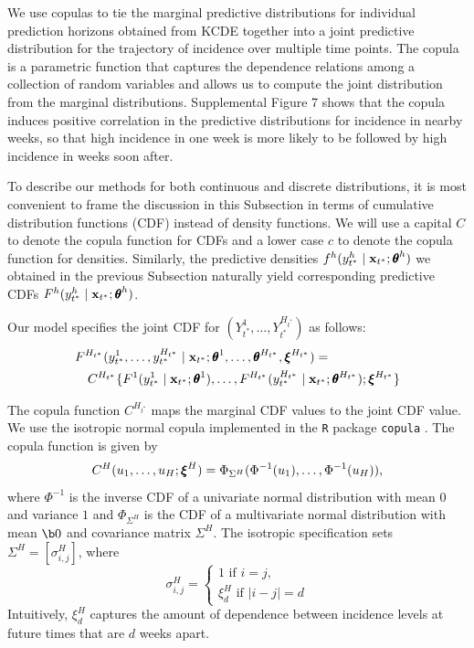 \documentclass[times, doublespace]{simauth}\usepackage[]{graphicx}\usepackage[]{color}
\begin{document}
We use copulas \cite{nelsen2007introductionCopulas} to tie the marginal
predictive distributions for individual prediction horizons obtained from KCDE together into a joint predictive
distribution for the trajectory of incidence over multiple time points.
The copula is a parametric function that captures the dependence relations among
a collection of random variables and allows us to compute the joint distribution
from the marginal distributions.  Supplemental Figure 7
shows that the copula induces positive correlation
in the predictive distributions for incidence in nearby weeks, so that high
incidence in one week is more likely to be followed by high incidence in
weeks soon after.

To describe our methods for both continuous and discrete distributions, it is
most convenient to frame the discussion in this Subsection in terms of
cumulative distribution functions (CDF) instead of density functions.
We will use a capital $C$ to denote the copula function for CDFs and a
lower case $c$ to denote the copula function for densities.  Similarly, the predictive
densities $f^{h}(y_{t^*}^h \mid \bx_{t^*}; \btheta^h)$ we obtained in the previous
Subsection naturally yield corresponding predictive CDFs
$F^{h}(y_{t^*}^h \mid \bx_{t^*}; \btheta^h)$.

Our model specifies the joint CDF for $(Y_{t^*}^1, \ldots, Y_{t^*}^{H_{t^*}})$
as follows:
\begin{align}
&F^{H_{t^*}}(y_{t^*}^1, \ldots, y_{t^*}^{H_{t^*}} \mid \bx_{t^*}; \btheta^1, \ldots, \btheta^{H_{t^*}}, \bxi^{H_{t^*}}) = \nonumber \\
&\quad C^{H_{t^*}}\{F^{1}(y_{t^*}^1 \mid \bx_{t^*}; \btheta^1), \ldots, F^{H_{t^*}}(y_{t^*}^{H_{t^*}} \mid \bx_{t^*}; \btheta^{H_{t^*}}); \bxi^{H_{t^*}}\}
\end{align}

The copula function $C^{H_{t^*}}$ maps the marginal CDF values to the joint
CDF value.  We use the isotropic normal
copula implemented in the {\tt R} \cite{RCoreLanguage} package {\tt copula}
\cite{HofertRCopulaPackage}.  The copula function is given by
\begin{equation}
C^H(u_1, \ldots, u_H ; \bxi^H) = \Phi_{\Sigma^H}(\Phi^{-1}(u_1), \ldots, \Phi^{-1}(u_H)),
\end{equation}
where $\Phi^{-1}$ is the inverse CDF of a univariate normal
distribution with mean $0$ and variance $1$ and $\Phi_{\Sigma^H}$ is the CDF
of a multivariate normal distribution with mean $\b0$ and covariance matrix
$\Sigma^H$.  The isotropic specification sets $\Sigma^H = [{\sigma^H_{i,j}}]$, where
\begin{equation}
{\sigma^H_{i,j}} = \begin{cases} 1 \text{ if $i = j$,} \\ \xi^H_d \text{ if $\vert i - j \vert = d$} \end{cases}
\end{equation}
Intuitively, $\xi^H_d$ captures the amount of dependence between incidence
levels at future times that are $d$ weeks apart.
\end{document}
